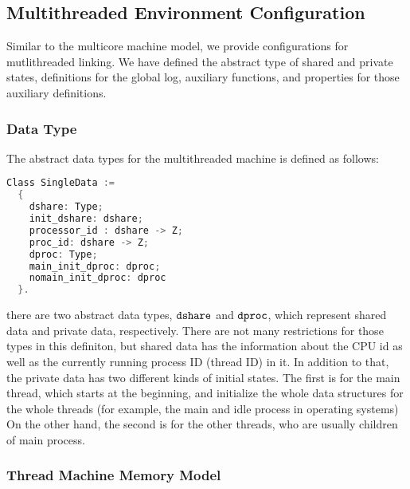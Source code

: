 
\subsection{Multithreaded Environment Configuration}
\label{chapter:linking:subsec:multithreaded-env-configuration}

Similar to the multicore machine model, we provide configurations 
for mutlithreaded linking. 
We have defined the abstract type of 
shared and private states, 
definitions for the global log, 
auxiliary functions,
and properties for those auxiliary definitions. 

\subsubsection{Data Type} 
The abstract data types for the multithreaded machine is defined as follows:
\begin{lstlisting}[language=C]
Class SingleData :=
  {
    dshare: Type;
    init_dshare: dshare;
    processor_id : dshare -> Z;
    proc_id: dshare -> Z;
    dproc: Type;
    main_init_dproc: dproc;
    nomain_init_dproc: dproc
  }.
\end{lstlisting} 
there are two abstract data types, ${\mathrm{\texttt{dshare}}}$ and ${\mathrm{\texttt{dproc}}}$, 
which represent shared data and private data, respectively. 
There are not many restrictions for those types in this definiton, 
but shared data has the information about the CPU id as well as the currently running process ID (thread ID) in it. 
In addition to that, 
the private data has two different kinds of initial states. 
The first is for the main thread, which starts at the beginning, 
and initialize the whole data structures for the whole  threads (for example, the main and idle process 
in operating systems)
On the other hand, the second is for the other threads, 
who are usually children of main process. 

\subsubsection{Thread Machine Memory Model}


